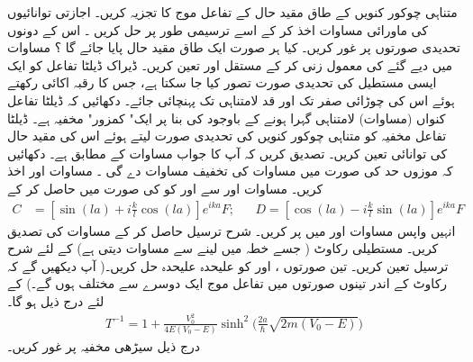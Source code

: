  
متناہی چوکور کنویں  کے طاق مقید حال کے تفاعل موج کا تجزیہ کریں۔ اجازتی توانائیوں کی ماورائی مساوات اخذ کر کے اسے ترسیمی طور پر حل کریں ۔ اس کے دونوں تحدیدی صورتوں پر غور کریں۔ کیا ہر صورت ایک طاق مقید حال پایا جائے گا ؟ 
 مساوات میں دیے گئے   کی معمول زنی کر کے   مستقل اور تعین کریں۔
ڈیراک ڈیلٹا تفاعل کو ایک ایسی مستطیل کی تحدیدی صورت تصور کیا جا سکتا ہے، جس کا رقبہ اکائی  رکھتے ہوئے اس کی چوڑائی صفر تک اور قد لامتناہی تک پہنچائی جائے۔ دکھائیں کہ ڈیلٹا تفاعل کنواں (مساوات) لامتناہی گہرا ہونے کے باوجود کی بنا پر ایک" کمزور" مخفیہ ہے۔ ڈیلٹا تفاعل مخفیہ کو متناہی چوکور کنویں  کی تحدیدی صورت لیتے ہوئے اس کی مقید حال کی توانائی تعین کریں۔ تصدیق کریں کہ آپ کا جواب مساوات کے مطابق ہے۔ دکھائیں کہ موزوں حد کی صورت میں مساوات کی تخفیف مساوات دے گی ۔
مساوات  اور  اخذ کریں۔ مساوات  اور سے  اور  کو  کی صورت میں حاصل کر کے
\begin{align*}
C&=[\sin(la)+i\frac{k}{l}\cos(la)]e^{ika}F; && D=[\cos(la)-i\frac{k}{l}\sin(la)]e^{ika}F
 \end{align*}
 انہیں واپس مساوات  اور  میں پر کریں۔ شرح ترسیل حاصل کر کے مساوات کی تصدیق کریں۔
مستطیلی رکاوٹ ( جسے خطہ میں لینے سے مساوات  دیتی ہے) کے لئے شرح ترسیل تعین کریں۔ تین صورتوں  ،
اور  کو علیحدہ علیحدہ حل کریں۔( آپ دیکھیں گے کہ رکاوٹ کے اندر تینوں صورتوں میں تفاعل موج ایک دوسرے سے مختلف ہوں گے۔)   کے لئے درج ذیل ہو گا۔
\begin{align*}
T^{-1}=1+\frac{V_{0}^2}{4E(V_{0}-E)}\sinh^{2}\Big(\frac{2a}{\hslash}\sqrt{2m(V_{0}-E)} \Big) 
\end{align*}
 درج ذیل سیڑھی مخفیہ پر غور کریں۔
